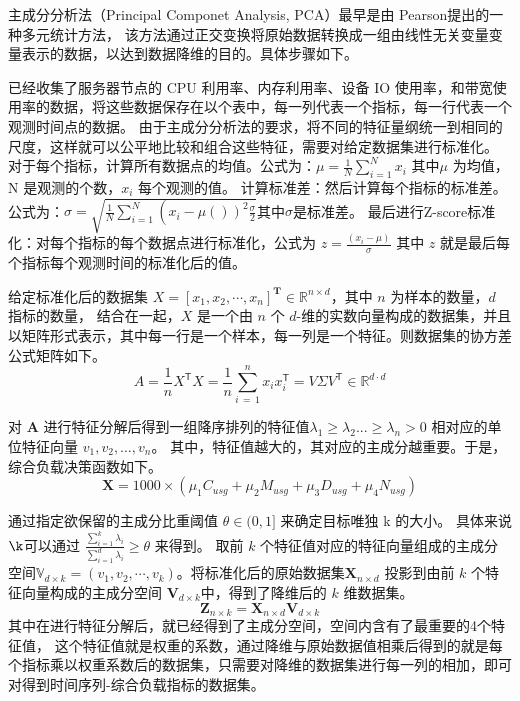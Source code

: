 主成分分析法（Principal Componet Analysis, PCA）最早是由 Pearson\cite{kpfrs1901lines}提出的一种多元统计方法，
该方法通过正交变换将原始数据转换成一组由线性无关变量变量表示的数据，以达到数据降维的目的\cite{李可佳2023基于主成分分析和函数机制的差分隐私线性回归算法}。具体步骤如下。

已经收集了服务器节点的 CPU 利用率、内存利用率、设备 IO 使用率，和带宽使用率的数据，将这些数据保存在以个表中，每一列代表一个指标，每一行代表一个观测时间点的数据。
由于主成分分析法的要求，将不同的特征量纲统一到相同的尺度，这样就可以公平地比较和组合这些特征，需要对给定数据集进行标准化。
对于每个指标，计算所有数据点的均值。公式为：$\mu=\frac{1}{N}\sum_{i=1}^{N}x_{i}$ 其中$\mu$ 为均值，N 是观测的个数，$x_{i}$ 每个观测的值。
计算标准差：然后计算每个指标的标准差。公式为：$\sigma = \sqrt{\frac{1}{N} \sum_{i = 1}^{N} \left(\right. x_{i} - \mu \left(\left.\right)\right)^{2}\frac{\sigma}{2}}$其中$\sigma$是标准差。
最后进行Z-score标准化：对每个指标的每个数据点进行标准化，公式为 $z = \frac{(x_{i} - \mu)}{\sigma}$ 其中 $z$ 就是最后每个指标每个观测时间的标准化后的值。

给定标准化后的数据集 $X = [x_1, x_2, \cdots, x_n]^{\mathbf{T}} \in \mathbb{R}^{n \times d}$，其中 $n$ 为样本的数量，$d$ 指标的数量，
结合在一起，\( X \) 是一个由 \( n \) 个 \( d \)-维的实数向量构成的数据集，并且以矩阵形式表示，其中每一行是一个样本，每一列是一个特征。则数据集的协方差公式矩阵如下。
\begin{equation}
  A={\frac{1}{n}}X^{\mathsf{T}}X={\frac{1}{n}}\sum_{i\,=\,1}^{n}x_{i}x_{i}^{\mathsf{T}}=V\Sigma V^{\mathsf{T}}\in\mathbb{R}^{d\cdot d}
\end{equation}

对 $\mathbf{A}$ 进行特征分解后得到一组降序排列的特征值$\lambda_1 \ge \lambda_2 ... \ge \lambda_n > 0$ 相对应的单位特征向量 $v_1, v_2, \dots, v_n$。
其中，特征值越大的，其对应的主成分越重要。于是，综合负载决策函数如下。
\begin{equation}
  \mathbf{X} = 1000 \times (\mu_1C_{usg} + \mu_2M_{usg} + \mu_3D_{usg} + \mu_4N_{usg})
\end{equation}

通过指定欲保留的主成分比重阈值 $\theta \in (0, 1]$ 来确定目标唯独 k 的大小。
具体来说$\k$可以通过 $\frac{\sum^{k}_{i = 1}\lambda_i}{\sum^{d}_{i = 1}\lambda_i} \ge \theta$ 来得到。
取前 $k$ 个特征值对应的特征向量组成的主成分空间$\mathbb{V}_{d \times k} = (v_1, v_2, \cdots, v_k)$。将标准化后的原始数据集$\mathbf{X}_{n \times d}$ 投影到由前 $k$ 个特征向量构成的主成分空间 $\mathbf{V}_{d \times k}$中，得到了降维后的 $k$ 维数据集。
\begin{equation}
  \mathbf{Z}_{n \times k} = \mathbf{X}_{n \times d}\mathbf{V}_{d \times k}
\end{equation}
其中在进行特征分解后，就已经得到了主成分空间，空间内含有了最重要的4个特征值，
这个特征值就是权重的系数，通过降维与原始数据值相乘后得到的就是每个指标乘以权重系数后的数据集，只需要对降维的数据集进行每一列的相加，即可对得到时间序列-综合负载指标的数据集。

